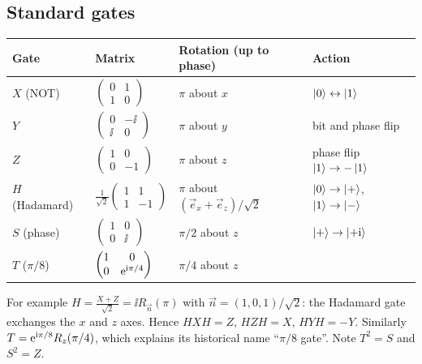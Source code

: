 \subsection{Standard gates}
\begin{center}
\begin{tabular}{@{}llll@{}}
\toprule
Gate & Matrix & Rotation (up to phase) & Action\\ \midrule
$X$ (NOT) & $\begin{pmatrix}0&1\\1&0\end{pmatrix}$ & $\pi$ about $x$ & $\left|0\right\rangle\leftrightarrow\left|1\right\rangle$\\[2ex]
$Y$ & $\begin{pmatrix}0&-\ii\\ \ii&0\end{pmatrix}$ & $\pi$ about $y$ & bit and phase flip\\[2ex]
$Z$ & $\begin{pmatrix}1&0\\0&-1\end{pmatrix}$ & $\pi$ about $z$ & phase flip $\left|1\right\rangle\to-\left|1\right\rangle$\\[2ex]
$H$ (Hadamard) & $\frac1{\sqrt2}\begin{pmatrix}1&1\\1&-1\end{pmatrix}$ & $\pi$ about $(\vec e_x+\vec e_z)/\sqrt2$ & $\left|0\right\rangle\to\left|+\right\rangle$, $\left|1\right\rangle\to\left|-\right\rangle$\\[2ex]
$S$ (phase) & $\begin{pmatrix}1&0\\0&\ii\end{pmatrix}$ & $\pi/2$ about $z$ & $\left|+\right\rangle\to\left|+\mathrm i\right\rangle$\\[2ex]
$T$ ($\pi/8$) & $\begin{pmatrix}1&0\\0&\mathrm e^{\mathrm i\pi/4}\end{pmatrix}$ & $\pi/4$ about $z$ & \\ \bottomrule
\end{tabular}
\end{center}
For example $H=\frac{X+Z}{\sqrt2}=\ii R_{\vec n}(\pi)$ with $\vec n=(1,0,1)/\sqrt2$: the Hadamard gate exchanges the $x$ and $z$ axes. Hence
$HXH=Z$, $HZH=X$, $HYH=-Y$. Similarly $T=\mathrm e^{\mathrm i\pi/8}R_z(\pi/4)$, which explains its historical name ``$\pi/8$ gate''. Note $T^2=S$ and $S^2=Z$.

